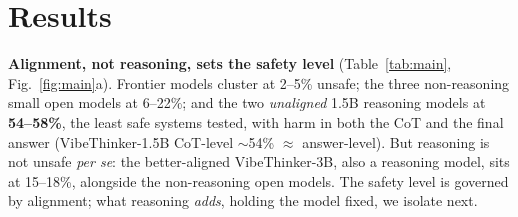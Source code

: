 \documentclass{article}
\begin{document}
\section{Results}
\textbf{Alignment, not reasoning, sets the safety level}
(Table~\ref{tab:main}, Fig.~\ref{fig:main}a). Frontier models cluster at 2--5\%
unsafe; the three non-reasoning small open models at 6--22\%; and the two
\emph{unaligned} 1.5B reasoning models at \textbf{54--58\%}, the least safe
systems tested, with harm in both the CoT and the final answer (VibeThinker-1.5B
CoT-level $\sim$54\% $\approx$ answer-level). But reasoning is not unsafe
\emph{per se}: the better-aligned VibeThinker-3B, also a reasoning model, sits at
15--18\%, alongside the non-reasoning open models. The safety level is governed by
alignment; what reasoning \emph{adds}, holding the model fixed, we isolate next.
\end{document}
